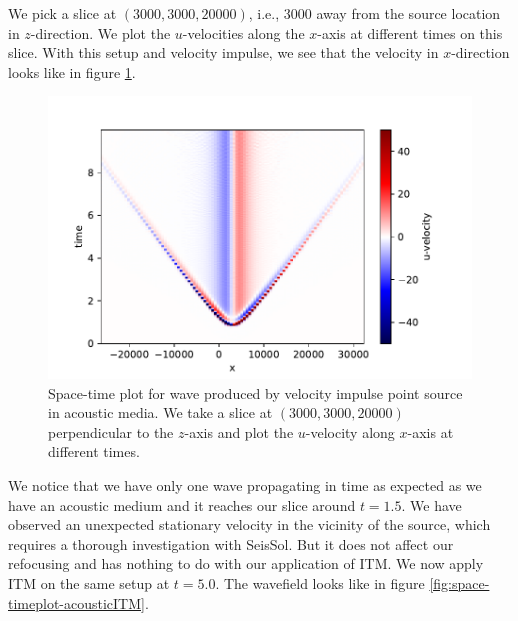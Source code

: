 We pick a slice at $\left(3000,3000,20000\right)$, i.e., 3000 away from the source location in $z$-direction.
We plot the $u$-velocities along the $x$-axis at different times on this slice. With this setup and velocity impulse, we see that the velocity in $x$-direction
looks like in figure \ref{fig:space-timeplot-acousticnoITM}.
\begin{figure}[htpb]
    \centering
    \includegraphics[width=0.9\linewidth]{figures/Acoustic-noITM.pdf}
    \caption{Space-time plot for wave produced by velocity impulse point source in acoustic media. We take a slice at $\left(3000,3000,20000\right)$ perpendicular to the $z$-axis 
    and plot the $u$-velocity along $x$-axis at different times.}
    \label{fig:space-timeplot-acousticnoITM}
\end{figure}

We notice that we have only one wave propagating in time as expected as we have an acoustic medium and it reaches our slice around $t=1.5$. 
We have observed an unexpected stationary velocity in the vicinity of the source, which requires a thorough investigation with SeisSol. But it does not affect our refocusing and has nothing to do with
our application of \ac{ITM}. We now apply ITM on the same setup at $t=5.0$. The wavefield looks like in figure \ref{fig:space-timeplot-acousticITM}.

